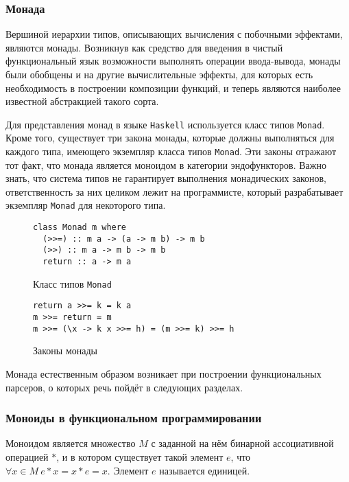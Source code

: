 \subsubsection{Монада}

Вершиной иерархии типов, описывающих вычисления с побочными эффектами, являются монады. Возникнув как средство для введения в чистый функциональный язык возможности выполнять операции ввода-вывода, монады были обобщены и на другие вычислительные эффекты, для которых есть необходимость в построении композиции функций, и теперь являются наиболее известной абстракцией такого сорта.

Для представления монад в языке \lstinline{Haskell} используется класс типов \lstinline{Monad}. Кроме того, существует три закона монады, которые должны выполняться для каждого типа, имеющего экземпляр класса типов \lstinline{Monad}. Эти законы отражают тот факт, что монада является моноидом в категории эндофункторов. Важно знать, что система типов не гарантирует выполнения монадических законов, ответственность за них целиком лежит на программисте, который разрабатывает экземпляр \lstinline{Monad} для некоторого типа. 

\begin{figure}[h]
\begin{lstlisting}
class Monad m where
  (>>=) :: m a -> (a -> m b) -> m b
  (>>) :: m a -> m b -> m b
  return :: a -> m a
\end{lstlisting}
\caption{Класс типов \lstinline{Monad}}
\label{listing:Monad}
\end{figure}

\begin{figure}[h]
\begin{lstlisting}
return a >>= k = k a
m >>= return = m
m >>= (\x -> k x >>= h) = (m >>= k) >>= h
\end{lstlisting}
\caption{Законы монады}
\label{listing:MonadLaws}
\end{figure}

Монада естественным образом возникает при построении функциональных парсеров, о которых речь пойдёт в следующих разделах. 

\subsubsection{Моноиды в функциональном программировании}

Моноидом является множество $M$ с заданной на нём бинарной ассоциативной операцией $*$, и в котором существует такой элемент $e$, что $\forall x \in M~e*x = x*e = x$. Элемент $e$ называется единицей.  

